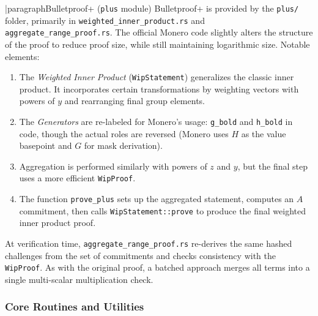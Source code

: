 |paragraph{Bulletproof+ (\texttt{plus} module)}
Bulletproof+ is provided by the \texttt{plus/} folder, primarily in \texttt{weighted\_inner\_product.rs} and \texttt{aggregate\_range\_proof.rs}.  The official Monero code slightly alters the structure of the proof to reduce proof size, while still maintaining logarithmic size.  Notable elements:
\begin{enumerate}
    \item The \emph{Weighted Inner Product} (\texttt{WipStatement}) generalizes the classic inner product.  It incorporates certain transformations by weighting vectors with powers of $y$ and rearranging final group elements. %
    \item The \emph{Generators} are re-labeled for Monero's usage: \texttt{g\_bold} and \texttt{h\_bold} in code, though the actual roles are reversed (Monero uses $H$ as the value basepoint and $G$ for mask derivation). %
    \item Aggregation is performed similarly with powers of $z$ and $y$, but the final step uses a more efficient \texttt{WipProof}.  
    \item The function \texttt{prove\_plus} sets up the aggregated statement, computes an $A$ commitment, then calls \texttt{WipStatement::prove} to produce the final weighted inner product proof. %
\end{enumerate}

At verification time, \texttt{aggregate\_range\_proof.rs} re-derives the same hashed challenges from the set of commitments and checks consistency with the \texttt{WipProof}.  As with the original proof, a batched approach merges all terms into a single multi-scalar multiplication check.  

\subsubsection{Core Routines and Utilities}

